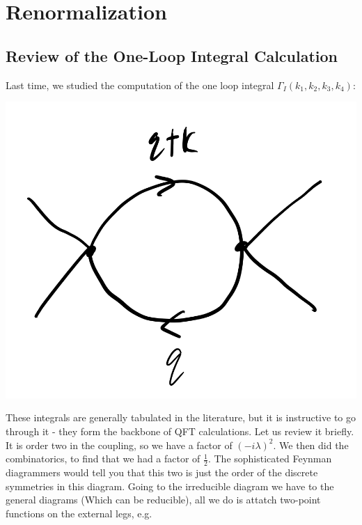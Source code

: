 \section{Renormalization}
\subsection{Review of the One-Loop Integral Calculation}
Last time, we studied the computation of the one loop integral $\Gamma_I(k_1, k_2, k_3, k_4)$:

\begin{center}
    \includegraphics[scale=0.5]{Images/fig-lec29feynman1.png}
\end{center}

These integrals are generally tabulated in the literature, but it is instructive to go through it - they form the backbone of QFT calculations. Let us review it briefly. It is order two in the coupling, so we have a factor of $(-i\lambda)^2$. We then did the combinatorics, to find that we had a factor of $\frac{1}{2}$. The sophisticated Feynman diagrammers would tell you that this two is just the order of the discrete symmetries in this diagram. Going to the irreducible diagram we have to the general diagrams (Which can be reducible), all we do is attatch two-point functions on the external legs, e.g.

